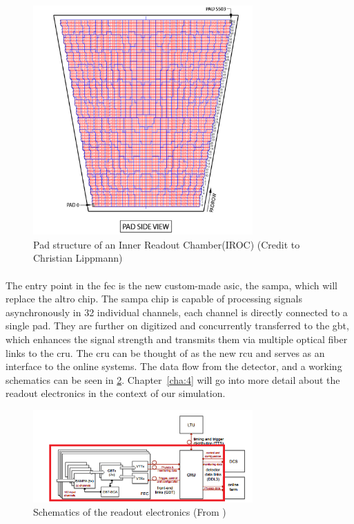 \documentclass[a4paper, 12pt]{report}
\begin{document}
\begin{figure}[h!]
	\centering
		\includegraphics[width=0.75\textwidth]{images/pad-structure.png}
		\caption{Pad structure of an Inner Readout Chamber(IROC) (Credit to Christian Lippmann)}
		\label{fig:pad-struct}
\end{figure}

\paragraph{}
The entry point in the \gls{fec} is the new custom-made \gls{asic}, the \gls{sampa}, which will replace the \gls{altro} chip\cite{tdr-015}.
The \gls{sampa} chip is capable of processing signals asynchronously in 32 individual channels, each channel is directly connected to a single pad.
They are further on digitized and concurrently transferred to the \gls{gbt}, which enhances the signal strength and transmits them via multiple optical fiber links to the \gls{cru}.
The \gls{cru} can be thought of as the new \gls{rcu} and serves as an interface to the online systems.
The data flow from the detector, and a working schematics can be seen in \ref{fig:fec}.
Chapter~\ref{cha:4} will go into more detail about the readout electronics in the context of our simulation.

\begin{figure}[h!]
	\centering
		\includegraphics[width=0.75\textwidth]{images/fec.png}
		\caption{Schematics of the readout electronics (From \cite{tdr-016})}
		\label{fig:fec}
\end{figure}
\end{document}

